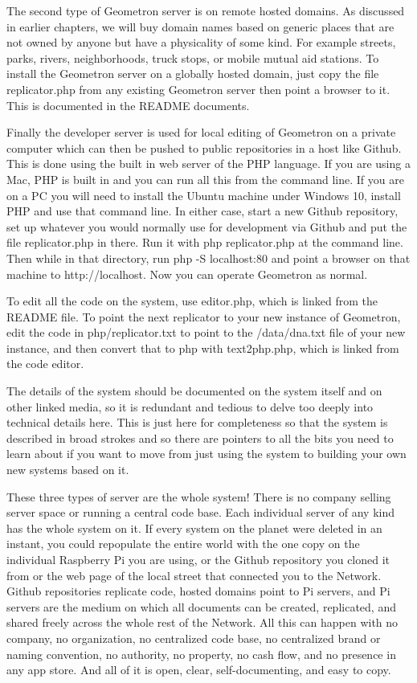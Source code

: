 The second type of Geometron server is on remote hosted domains.  As discussed in earlier chapters, we will buy domain names based on generic places that are not owned by anyone but have a physicality of some kind.  For example streets, parks, rivers, neighborhoods, truck stops, or mobile mutual aid stations.  To install the Geometron server on a globally hosted domain, just copy the file replicator.php from any existing Geometron server then point a browser to it.  This is documented in the README documents.

Finally the developer server is used for local editing of Geometron on a private computer which can then be pushed to public repositories in a host like Github.  This is done using the built in web server of the PHP language.  If you are using a Mac, PHP is built in and you can run all this from the command line.  If you are on a PC you will need to install the Ubuntu machine under Windows 10, install PHP and use that command line.  In either case, start a new Github repository, set up whatever you would normally use for development via Github and put the file replicator.php in there.  Run it with php replicator.php at the command line.  Then while in that directory, run php -S localhost:80 and point a browser on that machine to http://localhost.  Now you can operate Geometron as normal.

To edit all the code on the system, use editor.php, which is linked from the README file.  To point the next replicator to your new instance of Geometron, edit the code in php/replicator.txt to point to the /data/dna.txt file of your new instance, and then convert that to php with text2php.php, which is linked from the code editor.  

The details of the system should be documented on the system itself and on other linked media, so it is redundant and tedious to delve too deeply into technical details here.  This is just here for completeness so that the system is described in broad strokes and so there are pointers to all the bits you need to learn about if you want to move from just using the system to building your own new systems based on it.

These three types of server are the whole system!  There is no company selling server space or running a central code base.  Each individual server of any kind has the whole system on it. If every system on the planet were deleted in an instant, you could repopulate the entire world with the one copy on the individual Raspberry Pi you are using, or the Github repository you cloned it from or the web page of the local street that connected you to the Network.  Github repositories replicate code, hosted domains point to Pi servers, and Pi servers are the medium on which all documents can be created, replicated, and shared freely across the whole rest of the Network.  All this can happen with no company, no organization, no centralized code base, no centralized brand or naming convention, no authority, no property, no cash flow, and no presence in any app store. And all of it is open, clear, self-documenting, and easy to copy.

